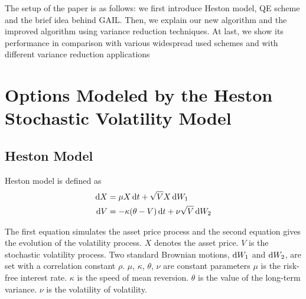 \documentclass{ws-ijfe}
\begin{document}
The setup of the paper is as follows: we first introduce Heston model, QE scheme and the brief idea behind GAIL. Then, we explain our new algorithm and the improved algorithm using variance reduction techniques. At last, we show its performance in comparison with various widespread used schemes and with different variance reduction applications

\section{Options Modeled by the Heston Stochastic Volatility Model}
\subsection{Heston Model}
Heston model is defined as
 \begin{align}
    \d X & =\mu X\,\d t+\sqrt{V}X\,\d W_1\label{eq1}\\
    \d V &= -\kappa (\theta-V)\,\d t +\nu\sqrt{V}\,\d W_2\label{eq2}
  \end{align}

 The first equation simulates the asset price process and the second equation gives the evolution of the volatility process. $X$ denotes the asset price. $V$ is the stochastic volatility process.  Two standard Brownian motions, $\mathrm{d} W_1$ and $\mathrm{d} W_2$, are set with a correlation constant $\rho$. $\mu$, $\kappa$, $\theta$, $\nu$ are constant parameters $\mu$ is the risk-free interest rate. $\kappa$ is the speed of mean reversion. $\theta$ is the value of the long-term variance. $\nu$ is the volatility of volatility.

\end{document}
